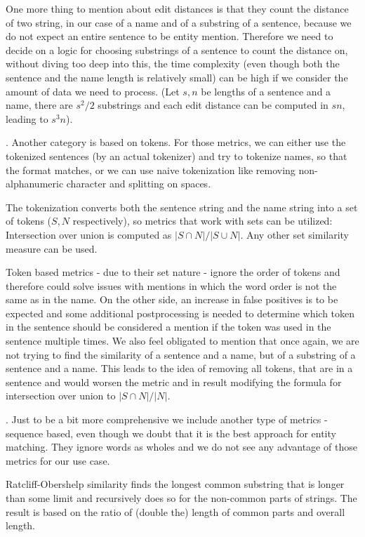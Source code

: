 One more thing to mention about edit distances is that they count the distance of two string, in our case of a name and of a substring of a sentence, because we do not expect an entire sentence to be entity mention. Therefore we need to decide on a logic for choosing substrings of a sentence to count the distance on, without diving too deep into this, the time complexity (even though both the sentence and the name length is relatively small) can be high if we consider the amount of data we need to process. (Let $s, n$ be lengths of a sentence and a name, there are $s^2/2$ substrings and each edit distance can be computed in $sn$, leading to $s^3n$). 

. Another category is based on tokens. For those metrics, we can either use the tokenized sentences (by an actual tokenizer) and try to tokenize names, so that the format matches, or we can use naive tokenization like removing non-alphanumeric character and splitting on spaces.

The tokenization converts both the sentence string and the name string into a set of tokens ($S, N$ respectively), so metrics that work with sets can be utilized: Intersection over union is computed as $|S \cap N| / |S \cup N|$. Any other set similarity measure can be used. 

Token based metrics - due to their set nature - ignore the order of tokens and therefore could solve issues with mentions in which the word order is not the same as in the name. On the other side, an increase in false positives is to be expected and some additional postprocessing is needed to determine which token in the sentence should be considered a mention if the token was used in the sentence multiple times. We also feel obligated to mention that once again, we are not trying to find the similarity of a sentence and a name, but of a substring of a sentence and a name. This leads to the idea of removing all tokens, that are in a sentence and would worsen the metric and in result modifying the formula for intersection over union to  $|S \cap N| / |N|$.


. Just to be a bit more comprehensive we include another type of metrics - sequence based, even though we doubt that it is the best approach for entity matching. They ignore words as wholes and we do not see any advantage of those metrics for our use case. 

Ratcliff-Obershelp similarity finds the longest common substring that is longer than some limit and recursively does so for the non-common parts of strings. The result is based on the ratio of (double the) length of common parts and overall length. 

